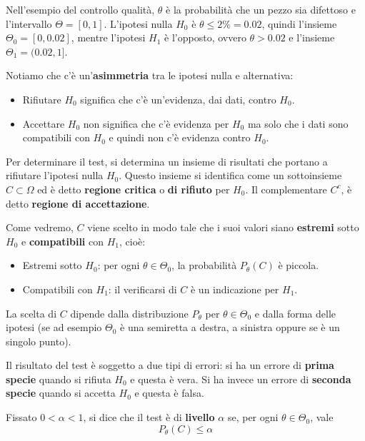 Nell'esempio del controllo qualità, $\theta$ è la probabilità che un pezzo sia difettoso e
l'intervallo $\Theta = [0,1]$. L'ipotesi nulla $H_0$ è $\theta \leq 2\% = 0.02$, quindi l'insieme
$\Theta_0 = [0, 0.02]$, mentre l'ipotesi $H_1$ è l'opposto, ovvero $\theta > 0.02$ e l'insieme
$\Theta_1 = (0.02, 1]$.

\begin{observation}
	Notiamo che c'è un'\textbf{asimmetria} tra le ipotesi nulla e alternativa:
	\begin{itemize}
		\item Rifiutare $H_0$ significa che c'è un'evidenza, dai dati, contro $H_0$.
		\item Accettare $H_0$ non significa che c'è evidenza per $H_0$ ma solo che i dati sono
		      compatibili con $H_0$ e quindi non c'è evidenza contro $H_0$.
	\end{itemize}
\end{observation}

Per determinare il test, si determina un insieme di risultati che portano a rifiutare l'ipotesi
nulla $H_0$. Questo insieme si identifica come un sottoinsieme $C \subset \Omega$ ed è detto
\textbf{regione critica} o \textbf{di rifiuto} per $H_0$. Il complementare $C^c$, è detto
\textbf{regione di accettazione}.

Come vedremo, $C$ viene scelto in modo tale che i suoi valori siano \textbf{estremi} sotto $H_0$ e
\textbf{compatibili} con $H_1$, cioè:
\begin{itemize}
	\item Estremi sotto $H_0$: per ogni $\theta \in \Theta_0$, la probabilità $P_\theta (C)$ è
	      piccola.
	\item Compatibili con $H_1$: il verificarsi di $C$ è un indicazione per $H_1$.
\end{itemize}
La scelta di $C$ dipende dalla distribuzione $P_\theta$ per $\theta \in \Theta_0$ e dalla forma
delle ipotesi (se ad esempio $\Theta_0$ è una semiretta a destra, a sinistra oppure se è un singolo
punto).

Il risultato del test è soggetto a due tipi di errori: si ha un errore di \textbf{prima specie}
quando si rifiuta $H_0$ e questa è vera. Si ha invece un errore di \textbf{seconda specie} quando
si accetta $H_0$ e questa è falsa.

\begin{definition}
	Fissato $0 < \alpha < 1$, si dice che il test è di \textbf{livello} $\alpha$ se, per ogni
	$\theta \in \Theta_0$, vale
	\[ P_\theta (C) \leq \alpha \]
\end{definition}

